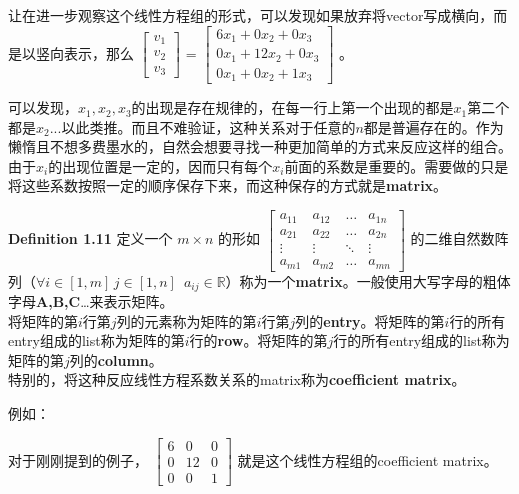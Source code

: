\documentclass{report}
\def\R{\mathbb{R}}
\def\b{\,\,\,}
\def\defb{\begin{tcolorbox} [colback=orange!20, colframe=orange!60, sharp corners, leftrule={3pt}, rightrule={0pt}, toprule={0pt}, bottomrule={0pt}, left={2pt}, right={2pt}, top={3pt}, bottom={3pt}]}
\def\defe{\end{tcolorbox}}
\def\egb{\begin{tcolorbox} [colback=cyan!20, colframe=cyan!40, sharp corners, leftrule={5pt}, rightrule={0pt}, toprule={0pt}, bottomrule={0pt}, left={2pt}, right={2pt}, top={3pt}, bottom={3pt}]}
\def\ege{\end{tcolorbox}}
\begin{document}
让在进一步观察这个线性方程组的形式，可以发现如果放弃将vector写成横向，而是以竖向表示，那么
$ \left[\begin{matrix}
	v_1 \\
	v_2 \\
	v_3
\end{matrix} \right]$ 
=
$ \left[\begin{matrix}
	6x_1 + 0x_2 + 0x_3\\
	0x_1 + 12x_2 + 0x_3\\
	0x_1 + 0x_2 + 1x_3
\end{matrix} \right]$ 
。

可以发现，$x_1,x_2,x_3$的出现是存在规律的，在每一行上第一个出现的都是$x_1$第二个都是$x_2$...以此类推。而且不难验证，这种关系对于任意的$n$都是普遍存在的。作为懒惰且不想多费墨水的，自然会想要寻找一种更加简单的方式来反应这样的组合。由于$x_i$的出现位置是一定的，因而只有每个$x_i$前面的系数是重要的。需要做的只是将这些系数按照一定的顺序保存下来，而这种保存的方式就是\textbf{matrix}。

\defb 
	\textbf{Definition 1.11}
	定义一个 $ m \times n $ 的形如
	$\left[ \begin{matrix}
		a_{11} & a_{12} & \dots & a_{1n} \\
		a_{21} & a_{22} & \dots & a_{2n} \\
		\vdots & \vdots & \ddots & \vdots \\
		a_{m1} & a_{m2} & \dots & a_{mn}		
	\end{matrix}\right]$
	的二维自然数阵列（$\forall i \in [1,m] \, j \in [1,n] \b a_{ij} \in \R $）称为一个\textbf{matrix}。一般使用大写字母的粗体字母\textbf{A,B,C}\dots 来表示矩阵。\\
	
	将矩阵的第$i$行第$j$列的元素称为矩阵的第$i$行第$j$列的\textbf{entry}。将矩阵的第$i$行的所有entry组成的list称为矩阵的第$i$行的\textbf{row}。将矩阵的第$j$行的所有entry组成的list称为矩阵的第$j$列的\textbf{column}。\\

	特别的，将这种反应线性方程系数关系的matrix称为\textbf{coefficient matrix}。
\defe

\egb
例如：

对于刚刚提到的例子，
$\left[ \begin{matrix}
	6 & 0 & 0 \\
	0 & 12 & 0 \\
	0 & 0 & 1
\end{matrix}\right]$
就是这个线性方程组的coefficient matrix。
\ege
\end{document}
